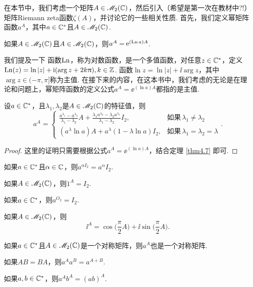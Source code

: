 在本节中，我们考虑一个矩阵$A\in\mathscr M_2(\mathbb C)$，然后引入（希望是第一次在教材中?!）矩阵Riemann zeta函数$\zeta(A)$，并讨论它的一些相关性质. 首先，我们定义幂矩阵函数$a^A$，其中$a\in \mathbb C^\ast$且$A\in\mathscr M_2(\mathbb C)$.

\begin{definition}
  如果$A\in\mathscr M_2(\mathbb C)$且$A\in\mathscr M_2(\mathbb C)$，则$a^A=\operatorname{\!\!\;\mathrm e}^{(\operatorname{Ln} a)A} $.
\end{definition}

\begin{remark}
  我们提及一下 \cite[p.224]{42} 函数$\operatorname{Ln}$，称为{\kaishu 对数函数}，是一个多值函数，对任意$z\in\mathbb C^\ast$，定义$\operatorname{Ln}(z)=\ln|z|+\mathrm i(\arg z+2k\uppi),k\in\mathbb Z$. 函数$\ln z=\ln|z|+\ii\arg z$，其中$\arg z\in(-\pi,\pi]$称为主值. 在接下来的内容，在这本书中，我们考虑的无论是在理论和问题上，幂矩阵函数的定义公式$a^A=\ee^{(\ln a)A}$都指的是主值.
\end{remark}

\begin{theorem}
  设$a\in\mathbb C^\ast$，且$\lambda_1,\lambda_2$是$A\in\mathscr M_2(\mathbb C)$的特征值，则
  \[
    a^A = \begin{cases}
      \frac{a^{\lambda_1}-a^{\lambda_2}}{\lambda_1-\lambda_2}
      A + \frac{\lambda_1a^{\lambda_2}
      -\lambda_2a^{\lambda_1}}{\lambda_1-\lambda_2}I_2,
      & \text{如果}\,\lambda_1 \ne \lambda_2 \\
      (a^\lambda \ln a)A + a^\lambda(1-\lambda \ln a)I_2, & \text{如果}\,\lambda_1=\lambda_2= \lambda
    \end{cases}.
  \]
\end{theorem}
\begin{proof}
  这里的证明只需要根据公式$a^A=\ee^{(\ln a)A}$，结合定理 \ref{thm4.7} 即可.
\end{proof}

\begin{corollary}[幂矩阵函数的性质.]
  \begin{enum}
    \item 如果$a\in\mathbb C^\ast$且$\alpha\in\mathbb C$，则$a^{\alpha I_2}=a^\alpha I_2 $.
    \item 如果$A\in\mathscr M_2(\mathbb C)$，则$1^A=I_2$.
    \item 如果$a\in\mathbb C^\ast$，则$a^{O_2}=I_2$.
    \item 如果$A\in\mathscr M_2(\mathbb C)$，则
    \[
      \ii^A = \cos\Big( \frac\pi2A \Big) + \ii \sin\Big( \frac\pi2 A\Big).
    \]
    \item 如果$a\in\mathbb C^\ast$且$A\in\mathscr M_2(\mathbb C)$是一个对称矩阵，则$a^A$也是一个对称矩阵.
    \item 如果$AB=BA$，则$a^Aa^B=a^{A+B}$.
    \item 如果$a,b\in\mathbb C^\ast$，则$a^Ab^A=(ab)^A$.
  \end{enum}
\end{corollary}


